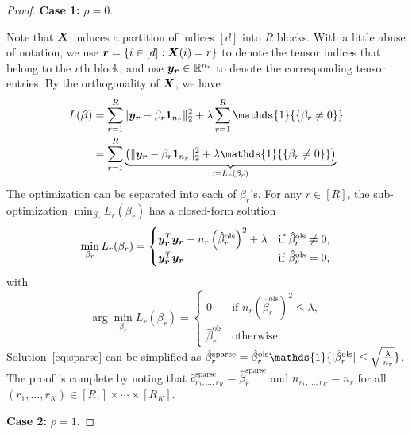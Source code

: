 \documentclass{article}
\newcommand*{\KeepStyleUnderBrace}[1]{%
  \mathop{%
    \mathchoice
    {\underbrace{\displaystyle#1}}%
    {\underbrace{\textstyle#1}}%
    {\underbrace{\scriptstyle#1}}%
    {\underbrace{\scriptscriptstyle#1}}%
  }\limits
}
\begin{document}
\begin{appendices}
\begin{proof}
{\bf Case 1: } $\rho=0$.\par
Note that $\bm X$ induces a partition of indices $[d]$ into $R$ blocks. With a little abuse of notation, we use ${\bm{r}}=\{i\in[d]:\bm X(i)=r\}$ to denote the tensor indices that belong to the $r$th block, and use $\bm{y}_{\bm{r}}\in\mathbb{R}^{n_r}$ to denote the corresponding tensor entries. By the orthogonality of $\bm X$, we have
\begin{equation}
\begin{split}
L(\boldsymbol{\beta})&=\sum_{r=1}^R \vnormSize{}{\my_{\mr}-\beta_r\mathbf{1}_{n_r}}^2+\lambda \sum_{r=1}^R \mathds{1}{\{ \beta_r\neq 0\}}\\
&=\sum_{r=1}^R\KeepStyleUnderBrace{\left( \vnormSize{}{\my_{\mr}-\beta_r\mathbf{1}_{n_r}}^2+\lambda \mathds{1}{\{ \beta_r\neq 0\}}\right)}_{:=L_r(\beta_r)}
\end{split}
\end{equation}
The optimization can be separated into each of $\beta_r$'s. For any $r\in[R]$, the sub-optimization $\min_{\beta_r}L_r(\beta_r)$ has a closed-form solution
\[
\min_{\beta_r} L_r(\beta_r)
=\begin{cases}
\bm{y}^T_{\bm{r}}\bm{y}_{\bm{r}}-n_r\left(\hat \beta_r^{\text{ols}}\right)^2+\lambda& \text{if $\hat \beta^{\text{ols}}_r\neq 0$,}\\
\bm{y}^T_{\bm{r}}\bm{y}_{\bm{r}}&\text{if $\hat \beta^{\text{ols}}_r=0$,}
\end{cases}
\]
with
\begin{equation}\label{eq:sparse}
\arg\min_{\beta_r} L_r(\beta_r)=
\begin{cases}
0\quad& \text{if $n_r\left(\hat \beta_r^{\text{ols}}\right)^2 \leq \lambda$},\\
\hat \beta_r^{\text{ols}} &\text{otherwise}.
\end{cases}
\end{equation}
Solution~\eqref{eq:sparse} can be simplified as $\hat \beta^{\text{sparse}}_r=\hat \beta^{\text{ols}}_r\mathds{1}\{|\hat \beta^{\text{ols}}_r| \leq \sqrt{\lambda \over n_r}\}$. The proof is complete by noting that $\hat c^{\text{sparse}}_{r_1,\ldots,r_R}=\hat \beta^{\text{sparse}}_r$ and $n_{r_1,\ldots,r_K}=n_r$ for all $(r_1,\ldots,r_K)\in[R_1]\times \cdots \times [R_K]$.



{\bf Case 2: } $\rho=1$.\par


\end{proof}
\end{appendices}
\end{document}
